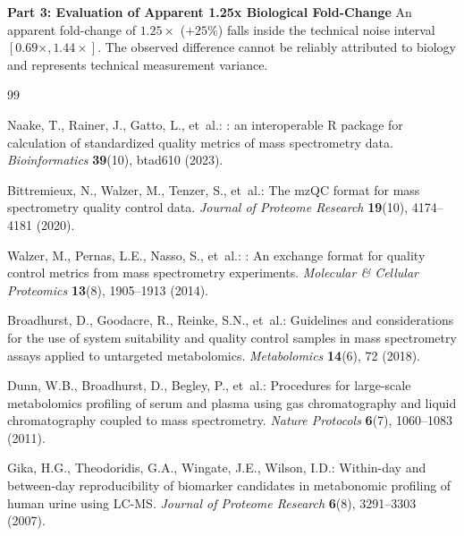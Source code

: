 \documentclass[11pt,twoside,openright]{book}
\begin{document}
\noindent\textbf{Part 3: Evaluation of Apparent 1.25x Biological Fold-Change}\enspace
An apparent fold-change of $1.25\times$ ($+25\%$) falls inside the technical noise interval $[0.69\times, 1.44\times]$. The observed difference cannot be reliably attributed to biology and represents technical measurement variance.

\begin{thebibliography}{99}

Naake, T., Rainer, J., Gatto, L., et~al.:
: an interoperable {R} package for calculation of standardized quality metrics of mass spectrometry data.
\newblock \emph{Bioinformatics} \textbf{39}(10), btad610 (2023).
\newblock {}

Bittremieux, N., Walzer, M., Tenzer, S., et~al.:
\newblock The {mzQC} format for mass spectrometry quality control data.
\newblock \emph{Journal of Proteome Research} \textbf{19}(10), 4174--4181 (2020).
\newblock {}

Walzer, M., Pernas, L.E., Nasso, S., et~al.:
: An exchange format for quality control metrics from mass spectrometry experiments.
\newblock \emph{Molecular \& Cellular Proteomics} \textbf{13}(8), 1905--1913 (2014).
\newblock {}

Broadhurst, D., Goodacre, R., Reinke, S.N., et~al.:
\newblock Guidelines and considerations for the use of system suitability and quality control samples in mass spectrometry assays applied to untargeted metabolomics.
\newblock \emph{Metabolomics} \textbf{14}(6), 72 (2018).
\newblock {}

Dunn, W.B., Broadhurst, D., Begley, P., et~al.:
\newblock Procedures for large-scale metabolomics profiling of serum and plasma using gas chromatography and liquid chromatography coupled to mass spectrometry.
\newblock \emph{Nature Protocols} \textbf{6}(7), 1060--1083 (2011).
\newblock {}

Gika, H.G., Theodoridis, G.A., Wingate, J.E., Wilson, I.D.:
\newblock Within-day and between-day reproducibility of biomarker candidates in metabonomic profiling of human urine using {LC-MS}.
\newblock \emph{Journal of Proteome Research} \textbf{6}(8), 3291--3303 (2007).
\newblock {}


\end{thebibliography}
\end{document}
